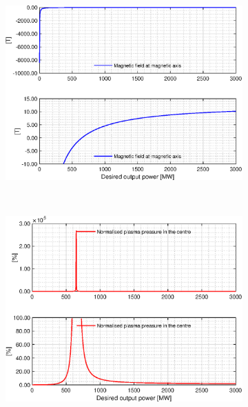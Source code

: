 \begin{figure}[H]
	\begin{subfigure}[h!]{.45\textwidth}
		\includegraphics[width=\textwidth]{MatlabFigures/PE/f7.eps}
	\end{subfigure}
	~
	\begin{subfigure}[h!]{.45\textwidth}
		\includegraphics[width=\textwidth]{MatlabFigures/PE/f8.eps}
	\end{subfigure}
\end{figure}

